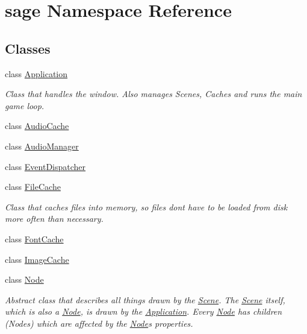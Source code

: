 \hypertarget{namespacesage}{}\section{sage Namespace Reference}
\label{namespacesage}
\subsection*{Classes}
\begin{DoxyCompactItemize}
\item 
class \mbox{\hyperlink{classsage_1_1Application}{Application}}
\begin{DoxyCompactList}\small\item\em Class that handles the window. Also manages Scenes, Caches and runs the main game loop. \end{DoxyCompactList}\item 
class \mbox{\hyperlink{classsage_1_1AudioCache}{Audio\+Cache}}
\item 
class \mbox{\hyperlink{classsage_1_1AudioManager}{Audio\+Manager}}
\item 
class \mbox{\hyperlink{classsage_1_1EventDispatcher}{Event\+Dispatcher}}
\item 
class \mbox{\hyperlink{classsage_1_1FileCache}{File\+Cache}}
\begin{DoxyCompactList}\small\item\em Class that caches files into memory, so files don\textquotesingle{}t have to be loaded from disk more often than necessary. \end{DoxyCompactList}\item 
class \mbox{\hyperlink{classsage_1_1FontCache}{Font\+Cache}}
\item 
class \mbox{\hyperlink{classsage_1_1ImageCache}{Image\+Cache}}
\item 
class \mbox{\hyperlink{classsage_1_1Node}{Node}}
\begin{DoxyCompactList}\small\item\em Abstract class that describes all things drawn by the \mbox{\hyperlink{classsage_1_1Scene}{Scene}}. The \mbox{\hyperlink{classsage_1_1Scene}{Scene}} itself, which is also a \mbox{\hyperlink{classsage_1_1Node}{Node}}, is drawn by the \mbox{\hyperlink{classsage_1_1Application}{Application}}. Every \mbox{\hyperlink{classsage_1_1Node}{Node}} has children (Nodes) which are affected by the \mbox{\hyperlink{classsage_1_1Node}{Node}}\textquotesingle{}s properties. \end{DoxyCompactList}\item 

\end{DoxyCompactItemize}
